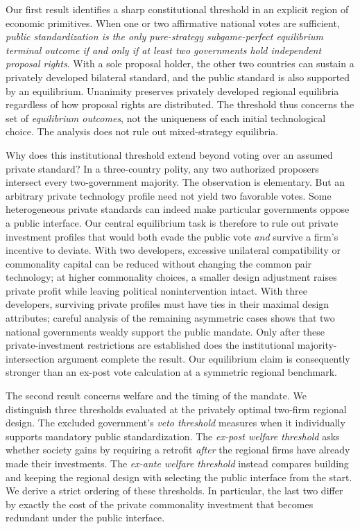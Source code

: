 Our first result identifies a sharp constitutional threshold in an explicit region of economic primitives. When one or two affirmative national votes are sufficient, \emph{public standardization is the only pure-strategy subgame-perfect equilibrium terminal outcome if and only if at least two governments hold independent proposal rights}. With a sole proposal holder, the other two countries can sustain a privately developed bilateral standard, and the public standard is also supported by an equilibrium. Unanimity preserves privately developed regional equilibria regardless of how proposal rights are distributed. The threshold thus concerns the set of \emph{equilibrium outcomes}, not the uniqueness of each initial technological choice. The analysis does not rule out mixed-strategy equilibria.

Why does this institutional threshold extend beyond voting over an assumed private standard? In a three-country polity, any two authorized proposers intersect every two-government majority. The observation is elementary. But an arbitrary private technology profile need not yield two favorable votes. Some heterogeneous private standards can indeed make particular governments oppose a public interface. Our central equilibrium task is therefore to rule out private investment profiles that would both evade the public vote \emph{and} survive a firm's incentive to deviate. With two developers, excessive unilateral compatibility or commonality capital can be reduced without changing the common pair technology; at higher commonality choices, a smaller design adjustment raises private profit while leaving political nonintervention intact. With three developers, surviving private profiles must have ties in their maximal design attributes; careful analysis of the remaining asymmetric cases shows that two national governments weakly support the public mandate. Only after these private-investment restrictions are established does the institutional majority-intersection argument complete the result. Our equilibrium claim is consequently stronger than an ex-post vote calculation at a symmetric regional benchmark.

The second result concerns welfare and the timing of the mandate. We distinguish three thresholds evaluated at the privately optimal two-firm regional design. The excluded government's \emph{veto threshold} measures when it individually supports mandatory public standardization. The \emph{ex-post welfare threshold} asks whether society gains by requiring a retrofit \emph{after} the regional firms have already made their investments. The \emph{ex-ante welfare threshold} instead compares building and keeping the regional design with selecting the public interface from the start. We derive a strict ordering of these thresholds. In particular, the last two differ by exactly the cost of the private commonality investment that becomes redundant under the public interface.

